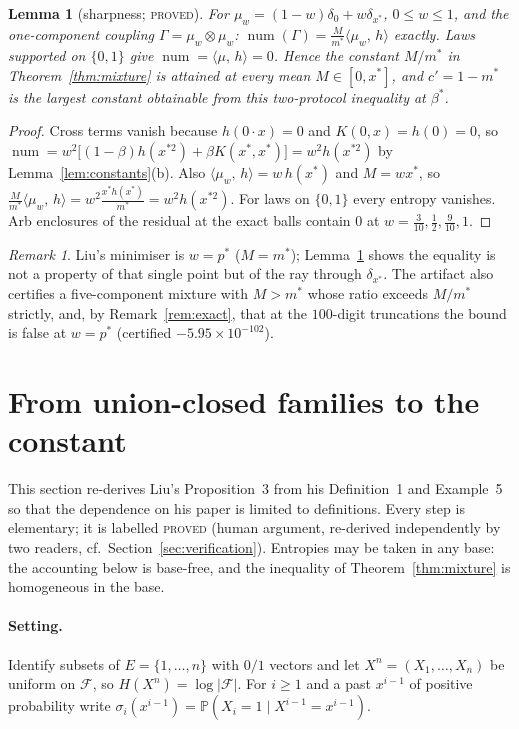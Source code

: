 \documentclass[11pt]{article}
\theoremstyle{plain}
\newtheorem{lemma}[theorem]{Lemma}
\theoremstyle{definition}
\theoremstyle{remark}
\newtheorem{remark}[theorem]{Remark}
\newcommand{\Prob}{\mathbb{P}}
\newcommand{\pr}[2]{\langle #1,\,#2\rangle}
\newcommand{\num}{\operatorname{num}}
\newcommand{\lbl}[1]{\textsc{#1}}
\begin{document}
\begin{lemma}[sharpness; \lbl{proved}]\label{lem:sharp}
For $\mu_w=(1-w)\delta_0+w\delta_{x^\ast}$, $0\le w\le1$, and the one-component
coupling $\Gamma=\mu_w\otimes\mu_w$: $\num(\Gamma)=\frac{M}{m^\ast}\pr{\mu_w}{h}$
exactly.  Laws supported on $\{0,1\}$ give $\num=\pr{\mu}{h}=0$.  Hence the
constant $M/m^\ast$ in Theorem~\ref{thm:mixture} is attained at every mean
$M\in[0,x^\ast]$, and $c'=1-m^\ast$ is the largest constant obtainable from
this two-protocol inequality at $\beta^\ast$.
\end{lemma}
\begin{proof}
Cross terms vanish because $h(0\cdot x)=0$ and $K(0,x)=h(0)=0$, so
$\num=w^2\bigl[(1-\beta)h(x^{\ast2})+\beta K(x^\ast,x^\ast)\bigr]=w^2h(x^{\ast2})$
by Lemma~\ref{lem:constants}(b).  Also $\pr{\mu_w}{h}=w\,h(x^\ast)$ and
$M=wx^\ast$, so $\frac{M}{m^\ast}\pr{\mu_w}{h}=w^2\frac{x^\ast h(x^\ast)}{m^\ast}=w^2h(x^{\ast2})$.
For laws on $\{0,1\}$ every entropy vanishes.  Arb enclosures of the
residual at the exact balls contain $0$ at $w=\tfrac3{10},\tfrac12,\tfrac9{10},1$.
\end{proof}

\begin{remark}
Liu's minimiser is $w=p^\ast$ ($M=m^\ast$); Lemma~\ref{lem:sharp} shows the
equality is not a property of that single point but of the ray through
$\delta_{x^\ast}$.  The artifact also certifies a five-component mixture with
$M>m^\ast$ whose ratio exceeds $M/m^\ast$ strictly, and, by
Remark~\ref{rem:exact}, that at the $100$-digit truncations the bound is
false at $w=p^\ast$ (certified $-5.95\times10^{-102}$).
\end{remark}

\section{From union-closed families to the constant}\label{sec:prop3}

This section re-derives Liu's Proposition~3 from his Definition~1 and
Example~5 so that the dependence on his paper is limited to definitions.
Every step is elementary; it is labelled \lbl{proved} (human argument,
re-derived independently by two readers, cf.\ Section~\ref{sec:verification}).
Entropies may be taken in any base: the accounting below is base-free, and
the inequality of Theorem~\ref{thm:mixture} is homogeneous in the base.

\paragraph{Setting.}
Identify subsets of $E=\{1,\dots,n\}$ with $0/1$ vectors and let
$X^n=(X_1,\dots,X_n)$ be uniform on $\mathcal F$, so $H(X^n)=\log|\mathcal F|$.
For $i\ge1$ and a past $x^{i-1}$ of positive probability write
$\sigma_i(x^{i-1})=\Prob(X_i=1\mid X^{i-1}=x^{i-1})$.
\end{document}
